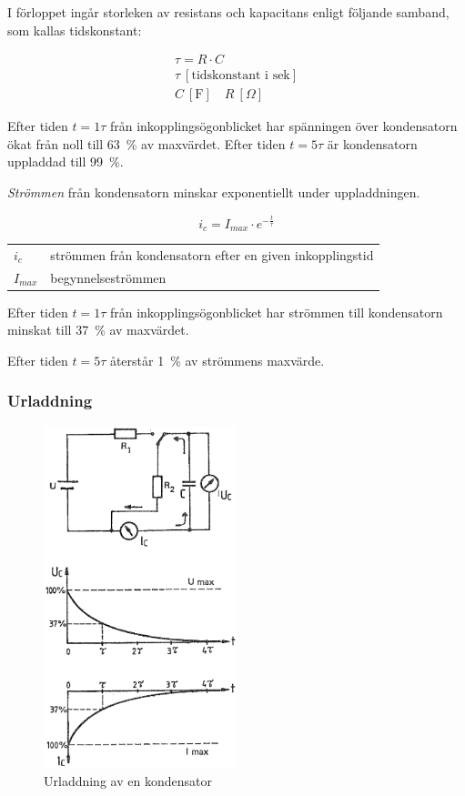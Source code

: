 I förloppet ingår storleken av resistans och kapacitans enligt följande samband,
som kallas tidskonstant:

\begin{gather*}
  \tau = R \cdot C \\
  \tau\ [\text{tidskonstant i sek}] \\  
  C\ [\text{F}] \quad R\ [Ω]
\end{gather*}

Efter tiden \(t = 1\tau\) från inkopplingsögonblicket har spänningen över
kondensatorn ökat från noll till 63~\% av maxvärdet. Efter tiden \(t = 5\tau\)
är kondensatorn uppladdad till 99~\%.

\emph{Strömmen} från kondensatorn minskar exponentiellt under uppladdningen.

\[i_c = I_{max} \cdot e^{-\frac{t}{\tau}}\]

\begin{tabular}{lp{}}
  \(i_c\) & strömmen från kondensatorn efter en given inkopplingstid \\
  \(I_{max}\) & begynnelseströmmen \\
\end{tabular}

Efter tiden \(t = 1\tau\) från inkopplingsögonblicket har strömmen till
kondensatorn minskat till 37~\% av maxvärdet.

Efter tiden \(t = 5\tau\) återstår 1~\% av strömmens maxvärde.

\subsubsection{Urladdning}

\begin{figure}
\includegraphics[width=0.5\textwidth]{images/cropped_pdfs/bild_2_3-09.pdf}
\caption{Urladdning av en kondensator}
\label{fig:BildII3-09}
\end{figure}

